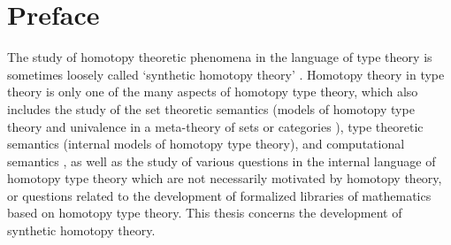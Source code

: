 \chapter{Preface}

%
The study of homotopy theoretic phenomena in the language of type theory \cite{hottbook} is 
sometimes loosely called `synthetic homotopy theory' \cite{Brunerie16}. 
Homotopy theory in type theory \cite{Awodey12} is only one of the
many aspects of homotopy type theory, which also includes the study of the
set theoretic semantics (models of homotopy type theory and univalence in a
meta-theory of sets or categories \cite{Awodey14,AwodeyWarren,BezemCoquandHuber,KapulkinLeFanuLumsdaine,Shulman15,Voevodsky15}), type theoretic semantics (internal models of homotopy type
theory), and computational semantics \cite{AngiuliHarperWilson}, as well as the study of various questions
in the internal language of homotopy type theory which are not necessarily 
motivated by homotopy theory, or questions related to the development of
formalized libraries of mathematics based on homotopy type theory.
This thesis concerns the development of synthetic homotopy theory.

